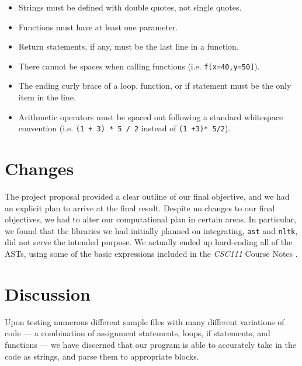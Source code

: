 \documentclass[fontsize=11pt]{article}
\begin{document}
\begin{itemize}
    \item Strings must be defined with double quotes, not single quotes.
    
    \item Functions must have at least one parameter.
    
    \item Return statements, if any, must be the last line in a function.
    
    \item There cannot be spaces when calling functions (i.e. \texttt{f[x=40,y=50]}).
    
    \item The ending curly brace of a loop, function, or if statement must be the only item in the line.
    
    \item Arithmetic operators must be spaced out following a standard whitespace convention (i.e. \texttt{(1 + 3) * 5 / 2} instead of \texttt{(1 +3)* 5/2}).
    
    
    
\end{itemize}

\section*{Changes}

The project proposal provided a clear outline of our final objective, and we had an explicit plan to arrive at the final result. Despite no changes to our final objectives, we had to alter our computational plan in certain areas. In particular, we found that the libraries we had initially planned on integrating, \texttt{ast} and \texttt{nltk}, did not serve the intended purpose. We actually ended up hard-coding all of the ASTs, using some of the basic expressions included in the \emph{CSC111} Course Notes \cite{david}.

\section*{Discussion}

Upon testing numerous different sample files with many different variations of code --- a combination of assignment statements, loops, if statements, and functions --- we have discerned that our program is able to accurately take in the code as strings, and parse them to appropriate blocks. 
\end{document}
